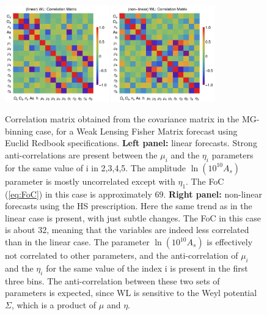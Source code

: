 \begin{figure}[htbp]
\centering
\includegraphics[width=0.4\textwidth]{Chapters/linear-nonlinear-MG-forecasts/figures/Decorrelations-WL/correlation-full-fiducialMGBin3-Euclid-WL-linearPK-}
\includegraphics[width=0.4\textwidth]{Chapters/linear-nonlinear-MG-forecasts/figures/Decorrelations-WL/correlation-full-fiducialMGBin3-Euclid-WL-nonlinearPk__Zhao-}
\caption[Correlation matrices for a WL Euclid forecast.]{\label{fig:WLcorr}
Correlation matrix obtained from the covariance matrix in the MG-binning case, for a Weak Lensing Fisher Matrix forecast using Euclid
Redbook specifications. \textbf{Left panel:} linear forecasts. Strong anti-correlations are present between the $\mu_i$ and the $\eta_i$ parameters for the same value of i in {2,3,4,5}. The amplitude $\ln(10^{10}A_{s})$ parameter is mostly uncorrelated except with $\eta_1$. 
The FoC (\ref{eq:FoC}) in this case is approximately $69$.
\textbf{Right panel:} non-linear 
forecasts using the HS prescription. Here the same trend as in the linear case is present, with just subtle changes. 
The FoC in this case is about $32$, meaning that the variables are indeed less correlated than in the linear case. 
The parameter $\ln(10^{10}A_{s})$ is effectively not correlated to other parameters, 
and the anti-correlation of $\mu_{i}$ and the $\eta_{i}$ for the same value of the index i is present in the first three bins. 
The anti-correlation between these two sets of parameters
is expected, since WL is sensitive to the Weyl potential $\Sigma$, which is a product of $\mu$ and $\eta$.}
\end{figure}


